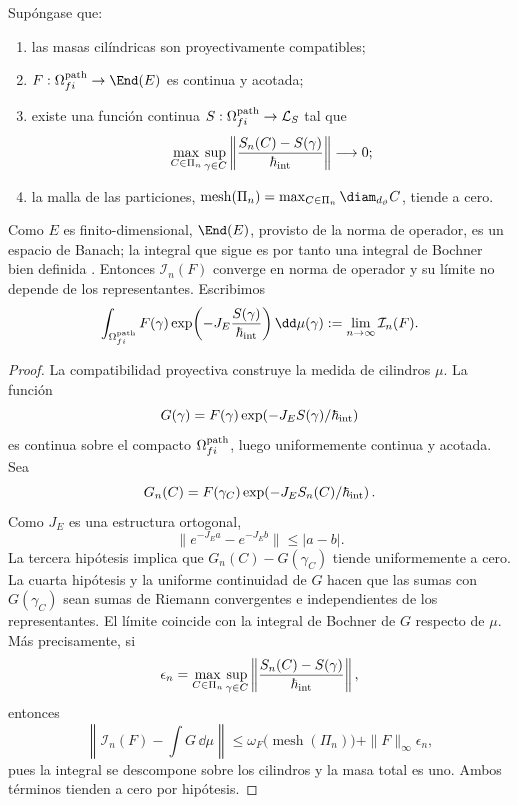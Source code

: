 \begin{theorem}
\label{thm:integral-cilindrica-limite}
Supóngase que:
\begin{enumerate}
 \item las masas cilíndricas son proyectivamente compatibles;
 \item \(F:\Omega_{fi}^{\rm path}\to\End(E)\) es continua y acotada;
 \item existe una función continua
       \(S:\Omega_{fi}^{\rm path}\to\mathcal L_S\) tal que
       \[
        \max_{C\in\Pi_n}\sup_{\gamma\in C}
        \left\|
          \frac{S_n(C)-S(\gamma)}{\hbar_{\rm int}}
        \right\|\longrightarrow0;
       \]
 \item la malla de las particiones,
       \(\operatorname{mesh}(\Pi_n)
        =\max_{C\in\Pi_n}\diam_{d_\vartheta}C\),
       tiende a cero.
\end{enumerate}
Como \(E\) es finito-dimensional, \(\End(E)\), provisto de la norma de
operador, es un espacio de Banach; la integral que sigue es por tanto una
integral de Bochner bien definida \cite{Bochner1955}.
Entonces \(\mathcal I_n(F)\) converge en norma de operador y su límite no
depende de los representantes. Escribimos
\begin{equation}
 \int_{\Omega_{fi}^{\rm path}}
 F(\gamma)
 \exp\!\left(-J_E\frac{S(\gamma)}{\hbar_{\rm int}}\right)
 \dd\mu(\gamma)
 :=\lim_{n\to\infty}\mathcal I_n(F).
 \label{eq:integral-genealogica}
\end{equation}
\end{theorem}

\begin{proof}
La compatibilidad proyectiva construye la medida de cilindros \(\mu\). La
función
\[
 G(\gamma)=F(\gamma)
 \exp\!\left(-J_E S(\gamma)/\hbar_{\rm int}\right)
\]
es continua sobre el compacto \(\Omega_{fi}^{\rm path}\), luego uniformemente
continua y acotada. Sea
\[
 G_n(C)=F(\gamma_C)
 \exp\!\left(-J_E S_n(C)/\hbar_{\rm int}\right).
\]
Como \(J_E\) es una estructura ortogonal,
\[
 \|e^{-J_Ea}-e^{-J_Eb}\|\leq |a-b|.
\]
La tercera hipótesis implica que
\(G_n(C)-G(\gamma_C)\) tiende uniformemente a cero. La cuarta hipótesis y la
uniforme continuidad de \(G\) hacen que las sumas con \(G(\gamma_C)\) sean
sumas de Riemann convergentes e independientes de los representantes. El
límite coincide con la integral de Bochner de \(G\) respecto de \(\mu\).
Más precisamente, si
\[
 \epsilon_n
 =\max_{C\in\Pi_n}\sup_{\gamma\in C}
   \left\|
    \frac{S_n(C)-S(\gamma)}{\hbar_{\rm int}}
   \right\|,
\]
entonces
\[
 \left\|\mathcal I_n(F)-\int G\,\dd\mu\right\|
 \leq
 \omega_F\!\bigl(\operatorname{mesh}(\Pi_n)\bigr)
 +\|F\|_\infty\epsilon_n,
\]
pues la integral se descompone sobre los cilindros y la masa total es uno.
Ambos términos tienden a cero por hipótesis.
\end{proof}

